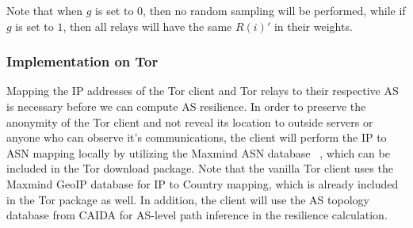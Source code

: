 %
%

Note that when $g$ is set to $0$, then no random sampling will be performed, while if $g$ is set to $1$, then all relays will have the same $R(i)\prime$ in their weights. 


\subsubsection{Implementation on Tor}
Mapping the IP addresses of the Tor client and Tor relays to their respective AS is necessary before we can compute AS resilience. In order to preserve the anonymity of the Tor client and not reveal its location to outside servers or anyone who can observe it's communications, the client will perform the IP to ASN mapping locally by utilizing the Maxmind ASN database ~\cite{maxmind}, which can be included in the Tor download package. Note that the vanilla Tor client uses the Maxmind GeoIP database for IP to Country mapping, which is already included in the Tor package as well. In addition, the client will use the AS topology database from CAIDA \cite{caida} for AS-level path inference in the resilience calculation. 

